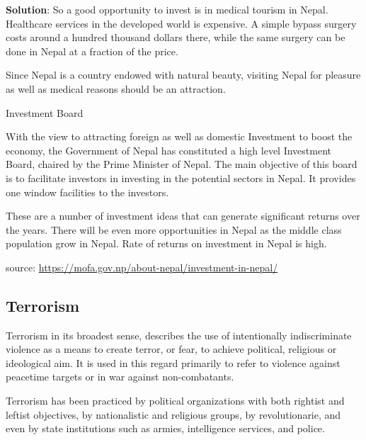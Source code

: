 \documentclass[
  openany]{book}
\newenvironment{solution}{ {\bfseries Solution}:}{}
\begin{document}
\begin{questions}
\begin{solution}
So a good opportunity to invest is in medical tourism in Nepal. Healthcare services in the developed world is expensive. A simple bypass surgery costs around a hundred thousand dollars there, while the same surgery can be done in Nepal at a fraction of the price.

Since Nepal is a country endowed with natural beauty, visiting Nepal for pleasure as well as medical reasons should be an attraction.

Investment Board

With the view to attracting foreign as well as domestic Investment to boost the economy, the Government of Nepal has constituted a high level Investment Board, chaired by the Prime Minister of Nepal. The main objective of this board is to facilitate investors in investing in the potential sectors in Nepal. It provides one window facilities to the investors.

These are a number of investment ideas that can generate significant returns over the years. There will be even more opportunities in Nepal as the middle class population grow in Nepal. Rate of returns on investment in Nepal is high.

source: \url{https://mofa.gov.np/about-nepal/investment-in-nepal/}
\end{solution}

\end{questions}

\hypertarget{terrorism}{%
\subsection{Terrorism}\label{terrorism}}

Terrorism in its broadest sense, describes the use of intentionally indiscriminate violence as a means to create terror, or fear, to achieve political, religious or ideological aim. It is used in this regard primarily to refer to violence against peacetime targets or in war against non-combatants.

Terrorism has been practiced by political organizations with both rightist and leftist objectives, by nationalistic and religious groups, by revolutionarie, and even by state institutions such as armies, intelligence services, and police.
\end{document}
